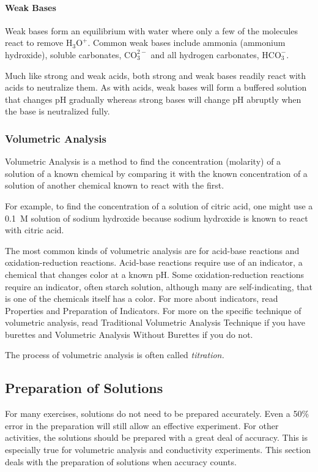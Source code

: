 \paragraph{Weak Bases}

Weak bases form an equilibrium with water where only a few of the molecules react to remove $\mathrm{H}_3\mathrm{O}^{+}$. Common weak bases include ammonia (ammonium hydroxide), soluble carbonates, $\mathrm{CO}_3^{2-}$ and all hydrogen carbonates, $\mathrm{HCO}_3^{-}$.

Much like strong and weak acids, both strong and weak bases readily react with acids to neutralize them. As with acids, weak bases will form a buffered solution that changes pH gradually whereas strong bases will change pH abruptly when the base is neutralized fully.

\subsubsection{Volumetric Analysis}

Volumetric Analysis is a method to find the concentration (molarity) of a solution of a known chemical by comparing it with the known concentration of a solution of another chemical known to react with the first.

For example, to find the concentration of a solution of citric acid, one might use a 0.1~M solution of sodium hydroxide because sodium hydroxide is known to react with citric acid.

The most common kinds of volumetric analysis are for acid-base reactions and oxidation-reduction reactions. Acid-base reactions require use of an indicator, a chemical that changes color at a known pH. Some oxidation-reduction reactions require an indicator, often starch solution, although many are self-indicating, that is one of the chemicals itself has a color. For more about indicators, read Properties and Preparation of Indicators. For more on the specific technique of volumetric analysis, read Traditional Volumetric Analysis Technique if you have burettes and Volumetric Analysis Without Burettes if you do not.

The process of volumetric analysis is often called \textit{titration.}


\subsection{Preparation of Solutions}

For many exercises, solutions do not need to be prepared accurately. Even a 50\% error in the preparation will still allow an effective experiment. For other activities, the solutions should be prepared with a great deal of accuracy. This is especially true for volumetric analysis and conductivity experiments. This section deals with the preparation of solutions when accuracy counts.

